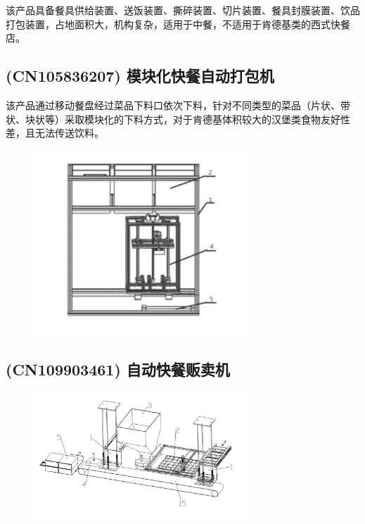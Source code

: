 该产品具备餐具供给装置、送饭装置、撕碎装置、切片装置、餐具封膜装置、饮品打包装置，占地面积大，机构复杂，适用于中餐，不适用于肯德基类的西式快餐店。


\subsection{(CN105836207) 模块化快餐自动打包机}

该产品通过移动餐盘经过菜品下料口依次下料，针对不同类型的菜品（片状、带状、块状等）采取模块化的下料方式，对于肯德基体积较大的汉堡类食物友好性差，且无法传送饮料。

\begin{figure}[h]
  \centering
  \includegraphics[width=8cm]{figure/intro3.jpg}
\end{figure}

\subsection{(CN109903461) 自动快餐贩卖机}

\begin{figure}[h]
  \centering
  \includegraphics[width=8cm]{figure/intro4.jpg}
\end{figure}

